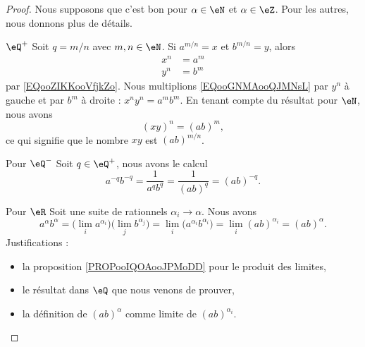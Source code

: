 \begin{proof}
    Nous supposons que c'est bon pour \( \alpha\in \eN\) et \( \alpha\in \eZ\). Pour les autres, nous donnons plus de détails.
    \begin{subproof}
        \item[\( \eQ^+\)]
            Soit \( q=m/n\) avec \( m,n\in \eN\). Si \( a^{m/n}=x\) et \( b^{m/n}=y\), alors
            \begin{subequations}
                \begin{align}
                    x^n&=a^m    \label{EQooGNMAooQJMNsL}\\
                    y^n&=b^m
                \end{align}
            \end{subequations}
            par \eqref{EQooZIKKooVfjkZo}. Nous multiplions \eqref{EQooGNMAooQJMNsL} par \( y^n\) à gauche et par \( b^m\) à droite : \( x^ny^n=a^mb^m\). En tenant compte du résultat pour \( \eN\), nous avons
            \begin{equation}
                (xy)^n=(ab)^m,
            \end{equation}
            ce qui signifie que le nombre \( xy\) est \( (ab)^{m/n}\).
        \item[Pour \( \eQ^-\)]
            Soit \( q\in \eQ^+ \), nous avons le calcul
            \begin{equation}
                a^{-q}b^{-q}=\frac{1}{ a^qb^q }=\frac{1}{ (ab)^q }=(ab)^{-q}.
            \end{equation}
        \item[Pour \( \eR\)]
            Soit une suite de rationnels \( \alpha_i\to \alpha\). Nous avons
            \begin{equation}
                a^{\alpha}b^{\alpha}=\big( \lim_ia^{\alpha_i} \big)\big( \lim_j b^{\alpha_j} \big)=\lim_i\big( a^{\alpha_i}b^{\alpha_i}\big)=\lim_i(ab)^{\alpha_i}=(ab)^{\alpha}.
            \end{equation}
            Justifications :
            \begin{itemize}
                \item la proposition \ref{PROPooIQOAooJPMoDD} pour le produit des limites,
                \item le résultat dans \( \eQ\) que nous venons de prouver,
                \item la définition de \( (ab)^{\alpha}\) comme limite de \( (ab)^{\alpha_i}\).
            \end{itemize}
    \end{subproof}
\end{proof}
    
